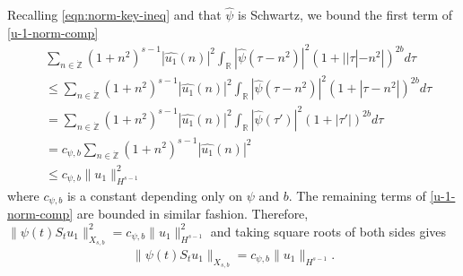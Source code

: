 \documentclass[12pt,reqno]{amsart}
\numberwithin{equation}{section}  %
\numberwithin{figure}{section}
\newcommand{\rr}{\mathbb{R}}
\newcommand{\zz}{\mathbb{Z}}
\newcommand{\wh}{\widehat}
\begin{document}
%
%
%
Recalling \eqref{eqn:norm-key-ineq} 
and that $\wh{\psi}$ is Schwartz, we bound the first term of
\eqref{u-1-norm-comp}  
%
%
\begin{equation*}
  \begin{split}
    & \sum_{n \in \dot{\zz}} \left( 1 + n^{2} \right)^{s-1} | \wh{u_{1}}(n)
    |^{2} \int_{\rr} | \wh{\psi}(\tau - n^{2}) |^{2}\left( 1 + | | \tau | -
    n^{2} | \right)^{2b} d \tau
    \\
    & \le  \sum_{n \in \dot{\zz}} \left( 1 + n^{2} \right)^{s-1} | \wh{u_{1}}(n)
    |^{2} \int_{\rr} | \wh{\psi}(\tau - n^{2}) |^{2}\left( 1 +  | \tau  -
    n^{2} | \right)^{2b} d \tau
    \\
    & = \sum_{n \in \dot{\zz}} \left( 1 + n^{2} \right)^{s-1} | \wh{u_{1}}(n)
    |^{2} \int_{\rr} | \wh{\psi}(\tau') |^{2}\left( 1 +  | \tau'| \right)^{2b} d \tau
    \\
    & = c_{\psi, b} \sum_{n \in \dot{\zz}} \left( 1 + n^{2} \right)^{s-1} | \wh{u_{1}}(n)
    |^{2} 
    \\
    & \le c_{\psi, b} \| u_{1} \|_{H^{s-1}}^{2}
  \end{split}
\end{equation*}
%
%
where $c_{\psi, b}$ is a constant depending only on $\psi$ and $b$. The
remaining terms of \eqref{u-1-norm-comp} are bounded in similar fashion.  
Therefore, 
$\|\psi(t) S_{t} u_{1}\|_{X_{s,b}}^{2} = c_{\psi, b}
\|u_{1}\|_{H^{s-1}}^2$ and
taking square roots of both sides gives
%
%
\begin{equation}
  \begin{split}
    \|\psi(t) S_{t} u_{1}\|_{X_{s,b}} = c_{\psi, b}
    \|u_{1}\|_{H^{s-1}}.
  \end{split}
  \label{eqn:u-1-fin-est}
\end{equation}
\end{document}
